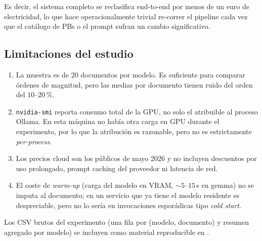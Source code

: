 Es decir, el sistema completo se reclasifica end-to-end por menos de un
euro de electricidad, lo que hace operacionalmente trivial re-correr el
pipeline cada vez que el catálogo de PBs o el prompt sufran un cambio
significativo.

\subsection{Limitaciones del estudio}

\begin{enumerate}
  \item La muestra es de 20 documentos por modelo. Es suficiente para
        comparar órdenes de magnitud, pero las medias por documento
        tienen ruido del orden del $10$--$20\,\%$.
  \item \texttt{nvidia-smi} reporta consumo total de la GPU, no solo el
        atribuible al proceso Ollama. En esta máquina no había otra carga
        en GPU durante el experimento, por lo que la atribución es
        razonable, pero no es estrictamente \emph{per-process}.
  \item Los precios cloud son los públicos de mayo 2026 y no incluyen
        descuentos por uso prolongado, prompt caching del proveedor ni
        latencia de red.
  \item El coste de \emph{warm-up} (carga del modelo en VRAM, $\sim 5$--$15$\,s
        en gemma) no se imputa al documento; en un servicio que ya tiene
        el modelo residente es despreciable, pero no lo sería en
        invocaciones esporádicas tipo \emph{cold start}.
\end{enumerate}

Los CSV brutos del experimento (una fila por (modelo, documento) y
resumen agregado por modelo) se incluyen como material reproducible en
.
